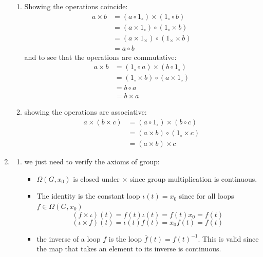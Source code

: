 \documentclass{pset}
\begin{document}
\begin{problem}
\begin{enumerate}
\begin{enumerate}[label=\roman*.]
            \item Showing the operations coincide:
            \begin{align*}
                a \times b &= (a \circ 1_\circ) \times (1_\circ \circ b) \\
                &= (a \times 1_\circ) \circ (1_\circ \times b) \\
                &= (a \times 1_\times) \circ (1_\times \times b) \\
                &= a \circ b
            \end{align*}
            and to see that the operations are commutative:
            \begin{align*}
                a \times b &= (1_\circ \circ a) \times (b \circ 1_\circ) \\
                &= (1_\circ \times b) \circ (a \times 1_\circ) \\
                &= b \circ a \\
                &= b \times a
            \end{align*}
            \item showing the operations are associative:
            \begin{align*}
                a \times (b \times c) &= (a \circ 1_\circ) \times (b \circ c) \\
                &= (a \times b) \circ (1_\circ \times c) \\
                &= (a \times b) \times c 
            \end{align*}
        \end{enumerate}
        \item
        \begin{enumerate}[label=\roman*.]
            \item we just need to verify the axioms of group:
            \begin{itemize}
                \item $\Omega(G, x_0)$ is closed under $\times$ since group multiplication is continuous.
                \item The identity is the constant loop $\iota(t)=x_0$ since for all loops $f\in\Omega(G, x_0)$
                \[(f\times\iota)(t) = f(t)\iota(t) = f(t)x_0 = f(t)\]
                \[(\iota\times f)(t) = \iota(t)f(t) = x_0f(t) = f(t)\]
                \item the inverse of a loop $f$ is the loop $\bar{f}(t) = f(t)^{-1}$. This is valid since the map that takes an element to its inverse is continuous.

\end{itemize}
\end{enumerate}
\end{enumerate}
\end{problem}
\end{document}
